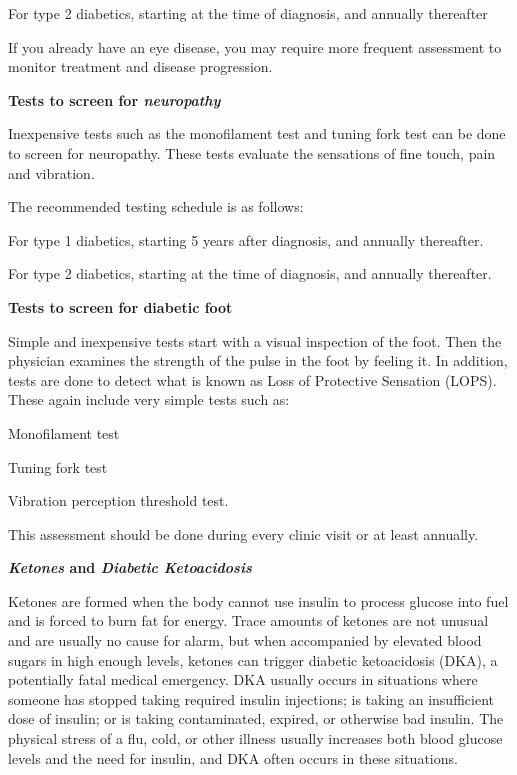  \item For type 2 diabetics, starting at the time of diagnosis, and annually thereafter

 \item If you already have an eye disease, you may require more frequent assessment to monitor treatment and disease progression.

\textbf{Tests to screen for \textit{neuropathy}}

Inexpensive tests such as the monofilament test and tuning fork test can be done to screen for neuropathy. These tests evaluate the sensations of fine touch, pain and vibration.

The recommended testing schedule is as follows:

\item For type 1 diabetics, starting 5 years after diagnosis, and annually thereafter.

 \item For type 2 diabetics, starting at the time of diagnosis, and annually thereafter.

\textbf{Tests to screen for diabetic foot}

Simple and inexpensive tests start with a visual inspection of the foot. Then the physician examines the strength of the pulse in the foot by feeling it. In addition, tests are done to detect what is known as Loss of Protective Sensation (LOPS). These again include very simple tests such as:

\item Monofilament test

 \item Tuning fork test

 \item Vibration perception threshold test.

This assessment should be done during every clinic visit or at least annually.

\textbf{\textit{Ketones} and \textit{Diabetic Ketoacidosis}}

Ketones are formed when the body cannot use insulin to process glucose into fuel and is forced to burn fat for energy. Trace amounts of ketones are not unusual and are usually no cause for alarm, but when accompanied by elevated blood sugars in high enough levels, ketones can trigger diabetic ketoacidosis (DKA), a potentially fatal medical emergency. DKA usually occurs in situations where someone has stopped taking required insulin injections; is taking an insufficient dose of insulin; or is taking contaminated, expired, or otherwise bad insulin. The physical stress of a flu, cold, or other illness usually increases both blood glucose levels and the need for insulin, and DKA often occurs in these situations.

